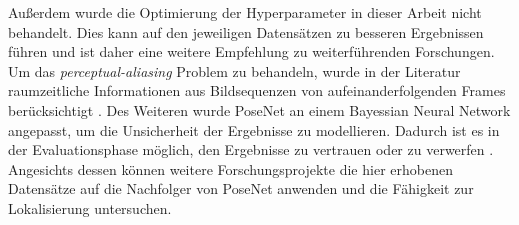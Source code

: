 Außerdem wurde die Optimierung der Hyperparameter in dieser Arbeit nicht behandelt. Dies kann auf den jeweiligen Datensätzen zu besseren Ergebnissen führen und ist daher eine weitere Empfehlung zu weiterführenden Forschungen. Um das \textit{perceptual-aliasing} Problem zu behandeln, wurde in der Literatur raumzeitliche Informationen aus Bildsequenzen von aufeinanderfolgenden Frames berücksichtigt \cite{walchImageBasedLocalizationUsing2017, clarkVidLocDeepSpatioTemporal2017}. Des Weiteren wurde PoseNet an einem Bayessian Neural Network angepasst, um die Unsicherheit der Ergebnisse zu modellieren. Dadurch ist es in der Evaluationsphase möglich, den Ergebnisse zu vertrauen oder zu verwerfen \cite{kendallModellingUncertaintyDeep2016}. Angesichts dessen können weitere Forschungsprojekte die hier erhobenen Datensätze auf die Nachfolger von PoseNet \cite{kendallModellingUncertaintyDeep2016, walchImageBasedLocalizationUsing2017, clarkVidLocDeepSpatioTemporal2017} anwenden und die Fähigkeit zur Lokalisierung untersuchen.